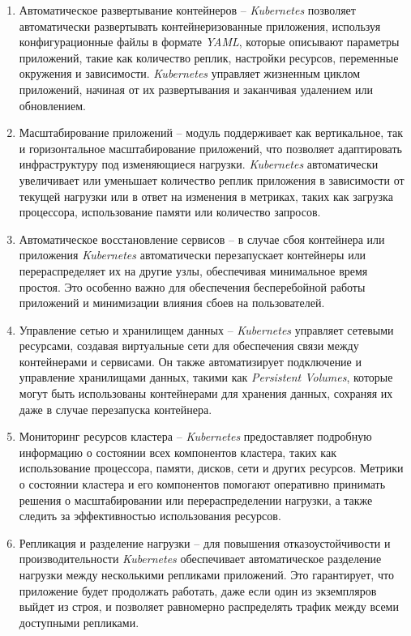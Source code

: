 \begin{enumerate}
    \item Автоматическое развертывание контейнеров -- \textit{Kubernetes} позволяет автоматически развертывать контейнеризованные приложения, используя конфигурационные файлы в формате \textit{YAML}, которые описывают параметры приложений, такие как количество реплик, настройки ресурсов, переменные окружения и зависимости. \textit{Kubernetes} управляет жизненным циклом приложений, начиная от их развертывания и заканчивая удалением или обновлением.
    \item Масштабирование приложений -- модуль поддерживает как вертикальное, так и горизонтальное масштабирование приложений, что позволяет адаптировать инфраструктуру под изменяющиеся нагрузки. \textit{Kubernetes} автоматически увеличивает или уменьшает количество реплик приложения в зависимости от текущей нагрузки или в ответ на изменения в метриках, таких как загрузка процессора, использование памяти или количество запросов.
    \item Автоматическое восстановление сервисов -- в случае сбоя контейнера или приложения \textit{Kubernetes} автоматически перезапускает контейнеры или перераспределяет их на другие узлы, обеспечивая минимальное время простоя. Это особенно важно для обеспечения бесперебойной работы приложений и минимизации влияния сбоев на пользователей.
    \item Управление сетью и хранилищем данных -- \textit{Kubernetes} управляет сетевыми ресурсами, создавая виртуальные сети для обеспечения связи между контейнерами и сервисами. Он также автоматизирует подключение и управление хранилищами данных, такими как \textit{Persistent Volumes}, которые могут быть использованы контейнерами для хранения данных, сохраняя их даже в случае перезапуска контейнера.
    \item Мониторинг ресурсов кластера -- \textit{Kubernetes} предоставляет подробную информацию о состоянии всех компонентов кластера, таких как использование процессора, памяти, дисков, сети и других ресурсов. Метрики о состоянии кластера и его компонентов помогают оперативно принимать решения о масштабировании или перераспределении нагрузки, а также следить за эффективностью использования ресурсов.
    \item Репликация и разделение нагрузки -- для повышения отказоустойчивости и производительности \textit{Kubernetes} обеспечивает автоматическое разделение нагрузки между несколькими репликами приложений. Это гарантирует, что приложение будет продолжать работать, даже если один из экземпляров выйдет из строя, и позволяет равномерно распределять трафик между всеми доступными репликами.

\end{enumerate}
